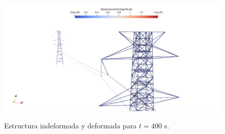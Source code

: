  
 \begin{figure}[htbp]
 	\centering
 	\includegraphics[width=120mm]{./imagenes/ResultadosNumericos/TransmissionTormenta/Deformadas.png}
 	\label{fig:RN:Transmission:Deformadas}
 	\caption{Estructura indeformada y deformada para $t=400$ s.}
 \end{figure}